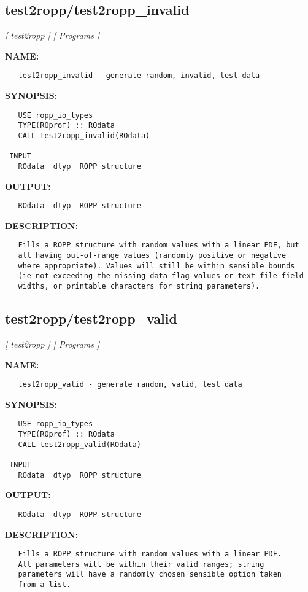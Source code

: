 \subsection{test2ropp/test2ropp\_invalid}
\textsl{[ test2ropp ]}
\textsl{[ Programs ]}

\label{ch:robo105}
\label{ch:test2ropp_test2ropp_invalid}
\textbf{NAME:}\hspace{0.08in}\begin{Verbatim}
   test2ropp_invalid - generate random, invalid, test data
\end{Verbatim}
\textbf{SYNOPSIS:}\hspace{0.08in}\begin{Verbatim}
   USE ropp_io_types
   TYPE(ROprof) :: ROdata
   CALL test2ropp_invalid(ROdata)

 INPUT
   ROdata  dtyp  ROPP structure
\end{Verbatim}
\textbf{OUTPUT:}\hspace{0.08in}\begin{Verbatim}
   ROdata  dtyp  ROPP structure
\end{Verbatim}
\textbf{DESCRIPTION:}\hspace{0.08in}\begin{Verbatim}
   Fills a ROPP structure with random values with a linear PDF, but
   all having out-of-range values (randomly positive or negative
   where appropriate). Values will still be within sensible bounds
   (ie not exceeding the missing data flag values or text file field
   widths, or printable characters for string parameters).
\end{Verbatim}
\subsection{test2ropp/test2ropp\_valid}
\textsl{[ test2ropp ]}
\textsl{[ Programs ]}

\label{ch:robo106}
\label{ch:test2ropp_test2ropp_valid}
\textbf{NAME:}\hspace{0.08in}\begin{Verbatim}
   test2ropp_valid - generate random, valid, test data
\end{Verbatim}
\textbf{SYNOPSIS:}\hspace{0.08in}\begin{Verbatim}
   USE ropp_io_types
   TYPE(ROprof) :: ROdata
   CALL test2ropp_valid(ROdata)

 INPUT
   ROdata  dtyp  ROPP structure
\end{Verbatim}
\textbf{OUTPUT:}\hspace{0.08in}\begin{Verbatim}
   ROdata  dtyp  ROPP structure
\end{Verbatim}
\textbf{DESCRIPTION:}\hspace{0.08in}\begin{Verbatim}
   Fills a ROPP structure with random values with a linear PDF.
   All parameters will be within their valid ranges; string
   parameters will have a randomly chosen sensible option taken
   from a list.
\end{Verbatim}
